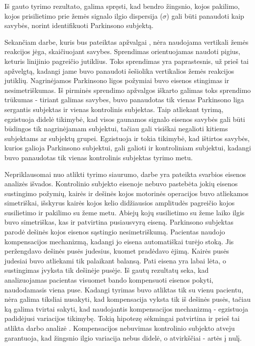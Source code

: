 \documentclass[]{vgtuef}
\begin{document}
Iš gauto tyrimo rezultato, galima spręsti, kad bendro žingsnio, kojos pakilimo, kojos prisilietimo prie žemės signalo ilgio dispersija ($\sigma$) gali būti panaudoti kaip savybės, norint identifikuoti Parkinsono subjektą.

Sekančiam darbe, kuris bus pateiktas apžvalgai \cite{6091948}, nėra naudojama vertikali žemės reakcijos jėga, skaičiuojant savybes. Sprendimas orientuojamas naudoti pigius, keturis linijinio pagreičio jutiklius. Toks sprendimas yra paprastesnis, už prieš tai apžvelgtą, kadangi jame buvo panaudoti šešiolika vertikalios žemės reakcijos jutiklių. Nagrinėjamos Parkinsono ligos požymiai buvo eisenos stingimas ir nesimetriškumas. Iš pirminės sprendimo apžvalgos iškarto galimas toks sprendimo trūkumas - tiriant galimas savybes, buvo panaudotas tik vienas Parkinsono liga sergantis subjektas ir vienas kontrolinis subjektas. Taip atliekant tyrimą, egzistuoja didelė tikimybė, kad visos gaunamos signalo eisenos savybės gali būti būdingos tik nagrinėjamam subjektui, tačiau gali visiškai negalioti kitiems subjektams ar subjektų grupei. Egzistuoja ir tokia tikimybė, kad ištirtos savybės, kurios galioja Parkinsono subjektui, gali galioti ir kontroliniam subjektui, kadangi buvo panaudotas tik vienas kontrolinis subjektas tyrimo metu.

Nepriklausomai nuo atlikti tyrimo siaurumo, darbe yra pateikta svarbios eisenos analizės išvados. Kontrolinio subjekto eisenoje nebuvo pastebėta jokių eisenos sustingimo požymių, kairės ir dešinės kojos motorinės operacijos buvo atliekamos simetriškai, išskyrus kairės kojos kelio didžiausios amplitudės pagreičio kojos susilietimo ir pakilimo su žeme metu. Abiejų kojų susilietimo su žeme laiko ilgis buvo simetriškas, kas ir patvirtina pusiausvyrą eiseną. Parkinsono subjektas parodė dešinės kojos eisenos sąstingio nesimetriškumą. Pacientas naudojo kompensacijos mechanizmą, kadangi jo eisena automatiškai turėjo stoką. Jis peržengdavo dešinės pusės judesius, kuomet pradėdavo ėjimą. Kairės pusės judesiai buvo atliekami tik palaikant balansą. Pati eisena yra labai lėta, o sustingimas įvyksta tik dešinėje pusėje. Iš gautų rezultatų seka, kad analizuojamas pacientas visuomet bando kompensuoti eisenos pokyti, naudodamasis viena puse. Kadangi tyrimas buvo atliktas tik su vienu pacientu, nėra galima tiksliai nusakyti, kad kompensacija vyksta tik iš dešinės pusės, tačiau ką galima tvirtai sakyti, kad naudojantis kompensacijos mechanizmą - egzistuoja padidėjusi variacijos tikimybę. Tokią hipotezę sėkmingai patvirtina ir prieš tai atlikta darbo analizė \cite{5280353}. Kompensacijos nebuvimas kontrolinio subjekto atveju garantuoja, kad žingsnio ilgio variacija nebus didelė, o atvirkščiai - artės į nulį.
\end{document}
